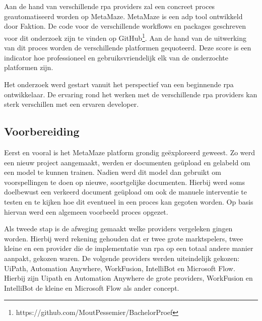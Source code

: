
\chapter{}
\label{ch:methodologie}

Aan de hand van verschillende \acrshort{rpa} providers zal een concreet proces geautomatiseerd worden op MetaMaze. MetaMaze is een \acrfull{adp} tool ontwikkeld door Faktion. De code voor de verschillende workflows en packages geschreven voor dit onderzoek zijn te vinden op GitHub\footnote{https://github.com/MoutPessemier/BachelorProef}. Aan de hand van de uitwerking van dit proces worden de verschillende platformen gequoteerd. Deze score is een indicator hoe professioneel en gebruiksvriendelijk elk van de onderzochte platformen zijn.

Het onderzoek werd gestart vanuit het perspectief van een beginnende \acrshort{rpa} ontwikkelaar. De ervaring rond het werken met de verschillende \acrshort{rpa} providers kan sterk verschillen met een ervaren developer.


\section{Voorbereiding}
Eerst en vooral is het MetaMaze platform grondig geëxploreerd geweest. Zo werd een nieuw project aangemaakt, werden er documenten geüpload en gelabeld om een model te kunnen trainen. Nadien werd dit model dan gebruikt om voorspellingen te doen op nieuwe, soortgelijke documenten. Hierbij werd soms doelbewust een verkeerd document geüpload om ook de manuele interventie te testen en te kijken hoe dit eventueel in een proces kan gegoten worden. Op basis hiervan werd een algemeen voorbeeld proces opgezet.

Als tweede stap is de afweging gemaakt welke providers vergeleken gingen worden. Hierbij werd rekening gehouden dat er twee grote marktspelers, twee kleine en een provider die de implementatie van \acrshort{rpa} op een totaal andere manier aanpakt, gekozen waren. De volgende providers werden uiteindelijk gekozen: UiPath, Automation Anywhere, WorkFusion, IntelliBot en Microsoft Flow. Hierbij zijn Uipath en Automation Anywhere de grote providers, WorkFusion en IntelliBot de kleine en Microsoft Flow als ander concept.

